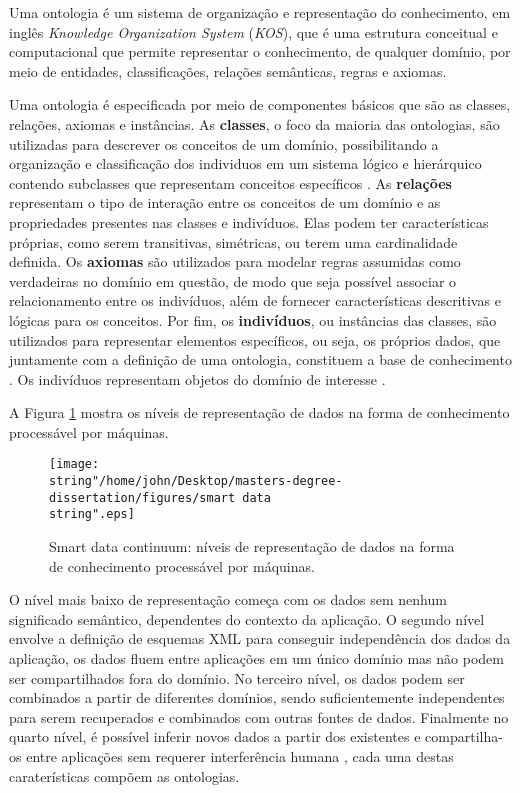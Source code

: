Uma ontologia é um sistema de organização e representação do conhecimento,
em inglês\emph{ }\foreignlanguage{english}{\emph{Knowledge Organization
System}} (\emph{KOS}),
que é uma estrutura conceitual e computacional que permite representar
o conhecimento, de qualquer domínio, por meio de entidades, classificações,
relações semânticas, regras e axiomas.

Uma ontologia é especificada por meio de componentes básicos que são
as classes, relações, axiomas e instâncias. As \textbf{classes}, o
foco da maioria das ontologias, são utilizadas para descrever os conceitos
de um domínio, possibilitando a organização e classificação dos individuos
em um sistema lógico e hierárquico contendo subclasses que representam
conceitos específicos \citet{noy2001ontology}. As \textbf{relações}
representam o tipo de interação entre os conceitos de um domínio e
as propriedades presentes nas classes e indivíduos. Elas podem ter
características próprias, como serem transitivas, simétricas, ou terem
uma cardinalidade definida. Os \textbf{axiomas} são utilizados para
modelar regras assumidas como verdadeiras no domínio em questão, de
modo que seja possível associar o relacionamento entre os indivíduos,
além de fornecer características descritivas e lógicas para os conceitos.
Por fim, os \textbf{indivíduos}, ou instâncias das classes, são utilizados
para representar elementos específicos, ou seja, os próprios dados,
que juntamente com a definição de uma ontologia, constituem a base
de conhecimento \citep{noy2001ontology}. Os indivíduos representam
objetos do domínio de interesse \citet{horridge2011owl}.

A Figura \ref{fig:Smart-data-continuum} mostra os níveis de representação
de dados na forma de conhecimento processável por máquinas.

\begin{figure}[H]
\centering{}\texttt{[image: \\string"/home/john/Desktop/masters-degree-dissertation/figures/smart data\\string".eps]}\caption{\foreignlanguage{english}{Smart data continuum\foreignlanguage{brazil}{: níveis de representação
de dados na forma de conhecimento processável por máquinas.\label{fig:Smart-data-continuum}}}}
\end{figure}

O nível mais baixo de representação começa com os dados sem nenhum
significado semântico, dependentes do contexto da aplicação. O segundo
nível envolve a definição de esquemas XML para conseguir independência
dos dados da aplicação, os dados fluem entre aplicações em um único
domínio mas não podem ser compartilhados fora do domínio. No terceiro
nível, os dados podem ser combinados a partir de diferentes domínios,
sendo suficientemente independentes para serem recuperados e combinados
com outras fontes de dados. Finalmente no quarto nível, é possível
inferir novos dados a partir dos existentes e compartilha-os entre
aplicações sem requerer interferência humana \citep{sugumaran2011},
cada uma destas caraterísticas compõem as ontologias.
%

